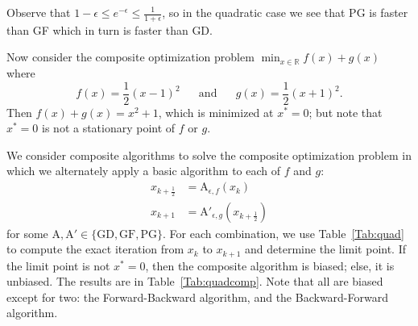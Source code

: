 \documentclass[final,12pt]{colt2018}
\newcommand{\R}{\mathbb{R}}
\begin{document}
\noindent
Observe that $1-\epsilon \le e^{-\epsilon} \le \frac{1}{1+\epsilon}$, so in the quadratic case we see that PG is faster than GF which in turn is faster than GD.


Now consider the composite optimization problem $\min_{x \in \R} f(x) + g(x)$ where
$$f(x) = \frac{1}{2}(x-1)^2 ~~~~~~ \text{ and } ~~~~~~ g(x) = \frac{1}{2} (x+1)^2.$$
Then $f(x)+g(x) = x^2 + 1$, which is minimized at $x^\ast = 0$; but note that $x^\ast = 0$ is not a stationary point of $f$ or $g$.

We consider composite algorithms to solve the composite optimization problem in which we alternately apply a basic algorithm to each of $f$ and $g$:
\begin{align*}
x_{k+\frac{1}{2}} &= \textrm{A}_{\epsilon,f}(x_k) \\
x_{k+1} &= \textrm{A}'_{\epsilon,g}(x_{k+\frac{1}{2}})
\end{align*}
for some $\textrm{A}, \textrm{A}' \in \{\textrm{GD}, \textrm{GF}, \textrm{PG}\}$.
For each combination, we use Table~\ref{Tab:quad} to compute the exact iteration from $x_k$ to $x_{k+1}$ and determine the limit point.
If the limit point is not $x^\ast = 0$, then the composite algorithm is biased; else, it is unbiased.
The results are in Table~\ref{Tab:quadcomp}.
Note that all are biased except for two: the Forward-Backward algorithm, and the Backward-Forward algorithm.
\end{document}

